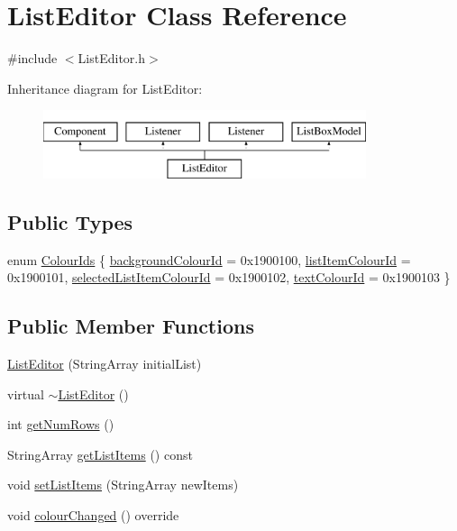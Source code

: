 \hypertarget{classListEditor}{}\section{List\+Editor Class Reference}
\label{classListEditor}


{\ttfamily \#include $<$List\+Editor.\+h$>$}

Inheritance diagram for List\+Editor\+:\begin{figure}[H]
\begin{center}
\leavevmode
\includegraphics[height=2.000000cm]{classListEditor}
\end{center}
\end{figure}
\subsection*{Public Types}
\begin{DoxyCompactItemize}
\item 
enum \mbox{\hyperlink{classListEditor_af4420d183bdc9aa3ebcbb967f2196c67}{Colour\+Ids}} \{ \mbox{\hyperlink{classListEditor_af4420d183bdc9aa3ebcbb967f2196c67aa57108934c6be3db46e950cbd5d8f25f}{background\+Colour\+Id}} = 0x1900100, 
\mbox{\hyperlink{classListEditor_af4420d183bdc9aa3ebcbb967f2196c67a73ad6c76af29afa03009fdff98d5b51b}{list\+Item\+Colour\+Id}} = 0x1900101, 
\mbox{\hyperlink{classListEditor_af4420d183bdc9aa3ebcbb967f2196c67a0d7332af1407467d42f48aa77595ffdf}{selected\+List\+Item\+Colour\+Id}} = 0x1900102, 
\mbox{\hyperlink{classListEditor_af4420d183bdc9aa3ebcbb967f2196c67a835bc6ccf892030d0a94f722face1915}{text\+Colour\+Id}} = 0x1900103
 \}
\end{DoxyCompactItemize}
\subsection*{Public Member Functions}
\begin{DoxyCompactItemize}
\item 
\mbox{\hyperlink{classListEditor_a3a5192ee7c78ecc19d9f1b9e21cf5285}{List\+Editor}} (String\+Array initial\+List)
\item 
virtual \mbox{\hyperlink{classListEditor_ae1d17155182eebb4b4e912d10d32bf61}{$\sim$\+List\+Editor}} ()
\item 
int \mbox{\hyperlink{classListEditor_a6c6a99c9a44c0ae3917cfd99cf55fde9}{get\+Num\+Rows}} ()
\item 
String\+Array \mbox{\hyperlink{classListEditor_a4ac52086c134de41552e98ba1c425e51}{get\+List\+Items}} () const
\item 
void \mbox{\hyperlink{classListEditor_aea184ebf953b388ad7a9565a2a383237}{set\+List\+Items}} (String\+Array new\+Items)
\item 
void \mbox{\hyperlink{classListEditor_a901d86cfa2ce035d1d57fe6af5a9200a}{colour\+Changed}} () override
\end{DoxyCompactItemize}


